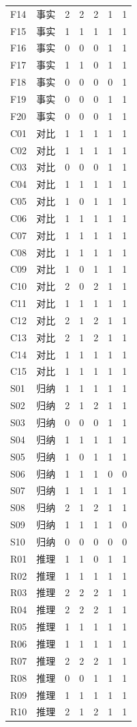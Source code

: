 \begin{longtable}{@{}l l r r r r r@{}}
F14 & 事实 & 2 & 2 & 2 & 1 & 1 \\
F15 & 事实 & 1 & 1 & 1 & 1 & 1 \\
F16 & 事实 & 0 & 0 & 0 & 1 & 1 \\
F17 & 事实 & 1 & 1 & 0 & 1 & 1 \\
F18 & 事实 & 0 & 0 & 0 & 0 & 1 \\
F19 & 事实 & 0 & 0 & 0 & 1 & 1 \\
F20 & 事实 & 0 & 0 & 0 & 1 & 1 \\
\addlinespace[4pt]
C01 & 对比 & 1 & 1 & 1 & 1 & 1 \\
C02 & 对比 & 1 & 1 & 1 & 1 & 1 \\
C03 & 对比 & 0 & 0 & 0 & 1 & 1 \\
C04 & 对比 & 1 & 1 & 1 & 1 & 1 \\
C05 & 对比 & 1 & 0 & 1 & 1 & 1 \\
C06 & 对比 & 1 & 1 & 1 & 1 & 1 \\
C07 & 对比 & 1 & 1 & 1 & 1 & 1 \\
C08 & 对比 & 1 & 1 & 1 & 1 & 1 \\
C09 & 对比 & 1 & 0 & 1 & 1 & 1 \\
C10 & 对比 & 2 & 0 & 2 & 1 & 1 \\
C11 & 对比 & 1 & 1 & 1 & 1 & 1 \\
C12 & 对比 & 2 & 1 & 2 & 1 & 1 \\
C13 & 对比 & 2 & 1 & 2 & 1 & 1 \\
C14 & 对比 & 1 & 1 & 1 & 1 & 1 \\
C15 & 对比 & 1 & 1 & 1 & 1 & 1 \\
\addlinespace[4pt]
S01 & 归纳 & 1 & 1 & 1 & 1 & 1 \\
S02 & 归纳 & 2 & 1 & 2 & 1 & 1 \\
S03 & 归纳 & 0 & 0 & 0 & 1 & 1 \\
S04 & 归纳 & 1 & 1 & 1 & 1 & 1 \\
S05 & 归纳 & 1 & 0 & 1 & 1 & 1 \\
S06 & 归纳 & 1 & 1 & 1 & 0 & 0 \\
S07 & 归纳 & 1 & 1 & 1 & 1 & 1 \\
S08 & 归纳 & 2 & 1 & 2 & 1 & 1 \\
S09 & 归纳 & 1 & 1 & 1 & 1 & 0 \\
S10 & 归纳 & 0 & 0 & 0 & 0 & 0 \\
\addlinespace[4pt]
R01 & 推理 & 1 & 1 & 0 & 1 & 1 \\
R02 & 推理 & 1 & 1 & 1 & 1 & 1 \\
R03 & 推理 & 2 & 2 & 2 & 1 & 1 \\
R04 & 推理 & 2 & 2 & 2 & 1 & 1 \\
R05 & 推理 & 1 & 1 & 1 & 1 & 1 \\
R06 & 推理 & 1 & 1 & 1 & 1 & 1 \\
R07 & 推理 & 2 & 2 & 2 & 1 & 1 \\
R08 & 推理 & 0 & 0 & 1 & 1 & 1 \\
R09 & 推理 & 1 & 1 & 1 & 1 & 1 \\
R10 & 推理 & 2 & 1 & 2 & 1 & 1 \\
\end{longtable}
\endgroup
